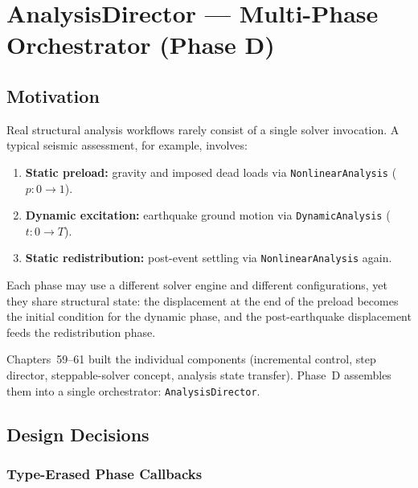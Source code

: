 \chapter{AnalysisDirector — Multi-Phase Orchestrator (Phase D)}
\label{ch:analysis_director}


\section{Motivation}

Real structural analysis workflows rarely consist of a single solver
invocation.  A typical seismic assessment, for example, involves:

\begin{enumerate}
  \item \textbf{Static preload:} gravity and imposed dead loads via
        \texttt{NonlinearAnalysis} ($p: 0 \to 1$).
  \item \textbf{Dynamic excitation:} earthquake ground motion via
        \texttt{DynamicAnalysis} ($t: 0 \to T$).
  \item \textbf{Static redistribution:} post-event settling via
        \texttt{NonlinearAnalysis} again.
\end{enumerate}

Each phase may use a different solver engine and different configurations,
yet they share structural state: the displacement at the end of the
preload becomes the initial condition for the dynamic phase, and the
post-earthquake displacement feeds the redistribution phase.

Chapters~59--61 built the individual components (incremental control,
step director, steppable-solver concept, analysis state transfer).
Phase~D assembles them into a single orchestrator:
\texttt{AnalysisDirector}.


\section{Design Decisions}

\subsection{Type-Erased Phase Callbacks}

